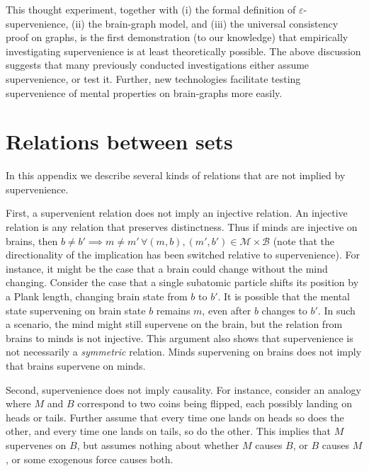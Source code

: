 \documentclass{article}
\providecommand{\mc}[1]{\mathcal{#1}}
\begin{document}

This thought experiment, together with (i) the formal definition of $\varepsilon$-supervenience, (ii) the brain-graph model, and (iii) the universal consistency proof on graphs, is the first demonstration (to our knowledge) that empirically investigating supervenience is at least theoretically possible. The above discussion suggests that many previously conducted investigations either assume supervenience, or test it.  Further, new technologies facilitate testing supervenience of mental properties on brain-graphs more easily.


\clearpage
\appendix



\section{Relations between sets} %
\label{sec:relations}

In this appendix we describe several kinds of relations that are not implied by supervenience.  


First, a supervenient relation does not imply an injective relation.  An injective relation is any relation that preserves distinctness.  Thus if minds are injective on brains, then $b\neq b' \implies m \neq m' \, \forall (m,b), (m',b') \in \mc{M} \times \mc{B}$ (note that the directionality of the implication has been switched relative to supervenience). For instance, it might be the case that a brain could change without the mind changing.  Consider the case that a single subatomic particle shifts its position by a Plank length, changing brain state from $b$ to $b'$.  It is possible that the mental state supervening on brain state $b$ remains $m$, even after $b$ changes to $b'$.  In such a scenario, the mind might still supervene on the brain, but the relation from brains to minds is not injective. This argument also shows that supervenience is not necessarily a \emph{symmetric} relation.  Minds supervening on brains does not imply that brains supervene on minds.  


Second,  supervenience does not imply causality. %
For instance, consider an analogy where $M$ and $B$ correspond to two coins being flipped, each possibly landing on heads or tails.  Further assume that every time one lands on heads so does the other, and every time one lands on tails, so do the other. This implies that $M$ supervenes on $B$, but assumes nothing about whether $M$ causes $B$, or $B$ causes $M$, or some exogenous force causes both.  
\end{document}
